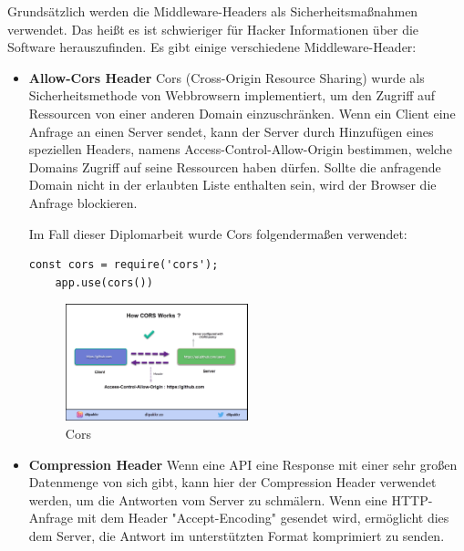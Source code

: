 Grundsätzlich werden die Middleware-Headers als Sicherheitsmaßnahmen verwendet. Das heißt es ist schwieriger für Hacker Informationen über die Software herauszufinden. Es gibt einige verschiedene Middleware-Header:

\begin{itemize}
    \item \textbf{Allow-Cors Header}
        \newline
        Cors (Cross-Origin Resource Sharing) wurde als Sicherheitsmethode von Webbrowsern implementiert, um den Zugriff auf Ressourcen von einer anderen Domain einzuschränken. Wenn ein Client eine Anfrage an einen Server sendet, kann der Server durch Hinzufügen eines speziellen Headers, namens Access-Control-Allow-Origin bestimmen, welche Domains Zugriff auf seine Ressourcen haben dürfen. Sollte die anfragende Domain nicht in der erlaubten Liste enthalten sein, wird der Browser die Anfrage blockieren.

        Im Fall dieser Diplomarbeit wurde Cors folgendermaßen verwendet:

\begin{lstlisting}[caption=Verwendung von Cors]
    const cors = require('cors');
    app.use(cors())
\end{lstlisting}
                
\begin{figure}[h]
    \centering
    \includegraphics[width=0.5\textwidth]{pics/cors.png}
    \caption{Cors}
    \label{fig:mesh1}
\end{figure}

        \cite{Cors}
        \newpage
    \item \textbf{Compression Header}
        \newline
        Wenn eine API eine Response mit einer sehr großen Datenmenge von sich gibt, kann hier der Compression Header verwendet werden, um die Antworten vom Server zu schmälern. Wenn eine HTTP-Anfrage mit dem Header "Accept-Encoding" gesendet wird, ermöglicht dies dem Server, die Antwort im unterstützten Format komprimiert zu senden.


\end{itemize}
